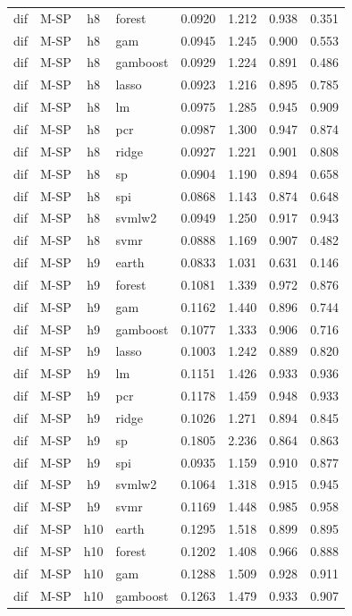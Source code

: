 \begin{ThreePartTable}
\begin{longtable}[t]{llclcccc}
dif & M-SP & h8 & forest & 0.0920 & 1.212 & 0.938 & 0.351\\
dif & M-SP & h8 & gam & 0.0945 & 1.245 & 0.900 & 0.553\\
dif & M-SP & h8 & gamboost & 0.0929 & 1.224 & 0.891 & 0.486\\
dif & M-SP & h8 & lasso & 0.0923 & 1.216 & 0.895 & 0.785\\
dif & M-SP & h8 & lm & 0.0975 & 1.285 & 0.945 & 0.909\\
dif & M-SP & h8 & pcr & 0.0987 & 1.300 & 0.947 & 0.874\\
dif & M-SP & h8 & ridge & 0.0927 & 1.221 & 0.901 & 0.808\\
dif & M-SP & h8 & sp & 0.0904 & 1.190 & 0.894 & 0.658\\
dif & M-SP & h8 & spi & 0.0868 & 1.143 & 0.874 & 0.648\\
dif & M-SP & h8 & svmlw2 & 0.0949 & 1.250 & 0.917 & 0.943\\
dif & M-SP & h8 & svmr & 0.0888 & 1.169 & 0.907 & 0.482\\
\addlinespace
dif & M-SP & h9 & earth & 0.0833 & 1.031 & 0.631 & 0.146\\
dif & M-SP & h9 & forest & 0.1081 & 1.339 & 0.972 & 0.876\\
dif & M-SP & h9 & gam & 0.1162 & 1.440 & 0.896 & 0.744\\
dif & M-SP & h9 & gamboost & 0.1077 & 1.333 & 0.906 & 0.716\\
dif & M-SP & h9 & lasso & 0.1003 & 1.242 & 0.889 & 0.820\\
dif & M-SP & h9 & lm & 0.1151 & 1.426 & 0.933 & 0.936\\
dif & M-SP & h9 & pcr & 0.1178 & 1.459 & 0.948 & 0.933\\
dif & M-SP & h9 & ridge & 0.1026 & 1.271 & 0.894 & 0.845\\
dif & M-SP & h9 & sp & 0.1805 & 2.236 & 0.864 & 0.863\\
dif & M-SP & h9 & spi & 0.0935 & 1.159 & 0.910 & 0.877\\
dif & M-SP & h9 & svmlw2 & 0.1064 & 1.318 & 0.915 & 0.945\\
dif & M-SP & h9 & svmr & 0.1169 & 1.448 & 0.985 & 0.958\\
\addlinespace
dif & M-SP & h10 & earth & 0.1295 & 1.518 & 0.899 & 0.895\\
dif & M-SP & h10 & forest & 0.1202 & 1.408 & 0.966 & 0.888\\
dif & M-SP & h10 & gam & 0.1288 & 1.509 & 0.928 & 0.911\\
dif & M-SP & h10 & gamboost & 0.1263 & 1.479 & 0.933 & 0.907\\

\end{longtable}
\end{ThreePartTable}
